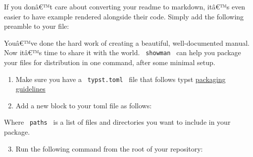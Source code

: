 If you donâ€™t care about converting your readme to markdown, itâ€™s
even easier to have example rendered alongside their code. Simply add
the following preamble to your file:

\begin{Shaded}
\begin{Highlighting}[]


\NormalTok{\textasciigrave{}\textasciigrave{}\textasciigrave{}}

\end{Highlighting}
\end{Shaded}

Youâ€™ve done the hard work of creating a beautiful, well-documented
manual. Now itâ€™s time to share it with the world. \texttt{\ showman\ }
can help you package your files for distribution in one command, after
some minimal setup.

\begin{enumerate}
\item
  Make sure you have a \texttt{\ typst.toml\ } file that follows typst
  \href{https://github.com/typst/packages}{packaging guidelines}
\item
  Add a new block to your toml file as follows:
\end{enumerate}

\begin{Shaded}
\begin{Highlighting}[]
 \OperatorTok{=} \OperatorTok{[}\OperatorTok{]}
\end{Highlighting}
\end{Shaded}

Where \texttt{\ paths\ } is a list of files and directories you want to
include in your package.

\begin{enumerate}
\setcounter{enumi}{2}
\tightlist
\item
  Run the following command from the root of your repository:
\end{enumerate}

